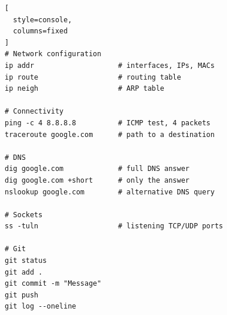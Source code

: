 \documentclass[11pt,a4paper]{article}
\theoremstyle{definition}
\theoremstyle{remark}
\begin{document}
\begin{lstlisting}[
  style=console,
  columns=fixed
]
# Network configuration
ip addr                    # interfaces, IPs, MACs
ip route                   # routing table
ip neigh                   # ARP table

# Connectivity
ping -c 4 8.8.8.8          # ICMP test, 4 packets
traceroute google.com      # path to a destination

# DNS
dig google.com             # full DNS answer
dig google.com +short      # only the answer
nslookup google.com        # alternative DNS query

# Sockets
ss -tuln                   # listening TCP/UDP ports

# Git
git status
git add .
git commit -m "Message"
git push
git log --oneline
\end{lstlisting}
\end{document}
